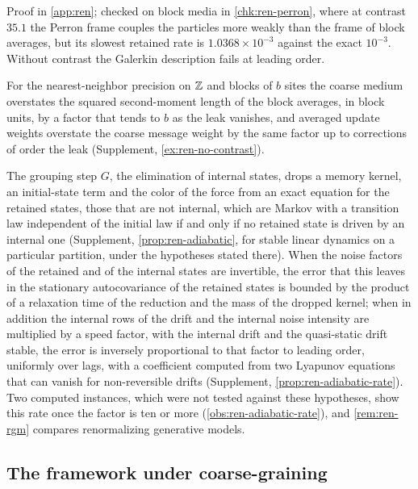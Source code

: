 Proof in \cref{app:ren}; checked on block media in \cref{chk:ren-perron}, where at contrast $35.1$ the Perron frame couples the particles more weakly than the frame of block averages, but its slowest retained rate is $1.0368\times10^{-3}$ against the exact $10^{-3}$. Without contrast the Galerkin description fails at leading order.

For the nearest-neighbor precision on $\mathbb{Z}$ and blocks of $b$ sites the coarse medium overstates the squared second-moment length of the block averages, in block units, by a factor that tends to $b$ as the leak vanishes, and averaged update weights overstate the coarse message weight by the same factor up to corrections of order the leak (Supplement, \cref{ex:ren-no-contrast}).

The grouping step $G$, the elimination of internal states, drops a memory kernel, an initial-state term and the color of the force from an exact equation for the retained states, those that are not internal, which are Markov with a transition law independent of the initial law if and only if no retained state is driven by an internal one (Supplement, \cref{prop:ren-adiabatic}, for stable linear dynamics on a particular partition, under the hypotheses stated there). When the noise factors of the retained and of the internal states are invertible, the error that this leaves in the stationary autocovariance of the retained states is bounded by the product of a relaxation time of the reduction and the mass of the dropped kernel; when in addition the internal rows of the drift and the internal noise intensity are multiplied by a speed factor, with the internal drift and the quasi-static drift stable, the error is inversely proportional to that factor to leading order, uniformly over lags, with a coefficient computed from two Lyapunov equations that can vanish for non-reversible drifts (Supplement, \cref{prop:ren-adiabatic-rate}). Two computed instances, which were not tested against these hypotheses, show this rate once the factor is ten or more (\cref{obs:ren-adiabatic-rate}), and \cref{rem:ren-rgm} compares renormalizing generative models.

\subsection{The framework under coarse-graining}\label{sec:ren-closure}

